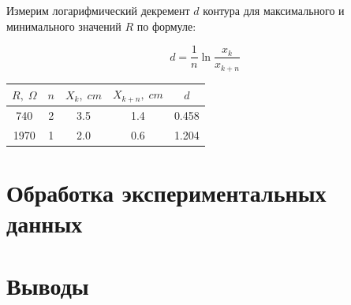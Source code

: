 \documentclass{article}
\begin{document}
Измерим логарифмический декремент \(d\) контура для максимального и минимального значений \(R\) по формуле:

\[ d = \frac{1}{n}\ln\frac{x_k}{x_{k+n}} \]

\begin{table}[H]
    \centering
    \begin{tabular}{|c|c|c|c|c|}
        \hline
    \(R,\; \Omega\) & \(n\) & \(X_k,\; cm\) & \(X_{k+n},\; cm\) & \(d\) \\\hline
    740  & 2 & 3.5 & 1.4 & 0.458 \\\hline
    1970 & 1 & 2.0 & 0.6 & 1.204 \\\hline
    \end{tabular}
\end{table}

\section{Обработка экспериментальных данных}

\section{Выводы}
\end{document}
